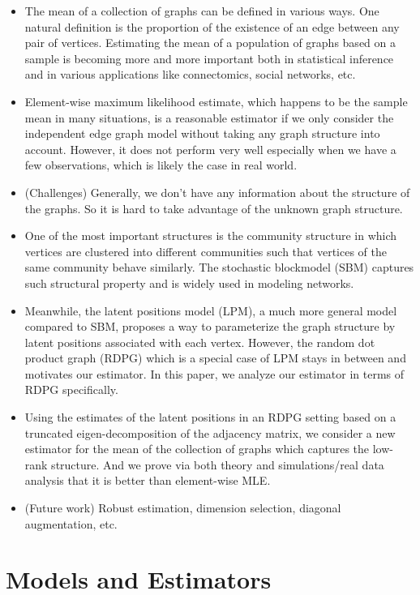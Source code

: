 \documentclass[a4paper]{article}
\begin{document}
\begin{itemize}
\item The mean of a collection of graphs can be defined in various ways. One natural definition is the proportion of the existence of an edge between any pair of vertices. Estimating the mean of a population of graphs based on a sample is becoming more and more important both in statistical inference and in various applications like connectomics, social networks, etc.
\item Element-wise maximum likelihood estimate, which happens to be the sample mean in many situations, is a reasonable estimator if we only consider the independent edge graph model without taking any graph structure into account. However, it does not perform very well especially when we have a few observations, which is likely the case in real world.
\item (Challenges) Generally, we don't have any information about the structure of the graphs. So it is hard to take advantage of the unknown graph structure.
\item One of the most important structures is the community structure in which vertices are clustered into different communities such that vertices of the same community behave similarly. The stochastic blockmodel (SBM) captures such structural property and is widely used in modeling networks.
\item Meanwhile, the latent positions model (LPM), a much more general model compared to SBM, proposes a way to parameterize the graph structure by latent positions associated with each vertex. However, the random dot product graph (RDPG) which is a special case of LPM stays in between and motivates our estimator. In this paper, we analyze our estimator in terms of RDPG specifically.
\item Using the estimates of the latent positions in an RDPG setting based on a truncated eigen-decomposition of the adjacency matrix, we consider a new estimator for the mean of the collection of graphs which captures the low-rank structure. And we prove via both theory and simulations/real data analysis that it is better than element-wise MLE.
\item (Future work) Robust estimation, dimension selection, diagonal augmentation, etc.
\end{itemize}


\section{Models and Estimators}
\end{document}

